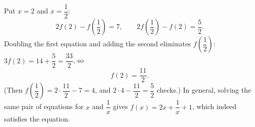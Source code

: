 Put $x=2$ and $x=\dfrac{1}{2}$:
\[
2f(2)-f\left(\dfrac{1}{2}\right)=7,\qquad 2f\left(\dfrac{1}{2}\right)-f(2)=\dfrac{5}{2} .
\]
Doubling the first equation and adding the second eliminates $f\left(\dfrac{1}{2}\right)$: $3f(2)=14+\dfrac{5}{2}=\dfrac{33}{2}$, so
\[
f(2)=\boxed{\dfrac{11}{2}}.
\]
(Then $f\left(\dfrac{1}{2}\right)=2\cdot\dfrac{11}{2}-7=4$, and $2\cdot4-\dfrac{11}{2}=\dfrac{5}{2}$ checks.) In general, solving the same pair of equations for $x$ and $\dfrac{1}{x}$ gives $f(x)=2x+\dfrac{1}{x}+1$, which indeed satisfies the equation.
